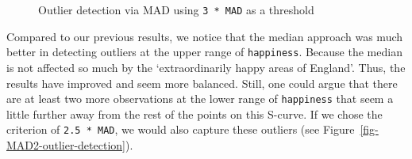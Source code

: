 \documentclass[
  letterpaper,
]{krantz}
\begin{document}
\begin{figure}[H]


\caption{\label{fig-outlier-detection-median-mad3}Outlier detection via
MAD using \texttt{3\ *\ MAD} as a threshold}

\end{figure}%

Compared to our previous results, we notice that the median approach was
much better in detecting outliers at the upper range of
\texttt{happiness}. Because the median is not affected so much by the
`extraordinarily happy areas of England'. Thus, the results have
improved and seem more balanced. Still, one could argue that there are
at least two more observations at the lower range of \texttt{happiness}
that seem a little further away from the rest of the points on this
S-curve. If we chose the criterion of \texttt{2.5\ *\ MAD}, we would
also capture these outliers (see
Figure~\ref{fig-MAD2-outlier-detection}).
\end{document}
